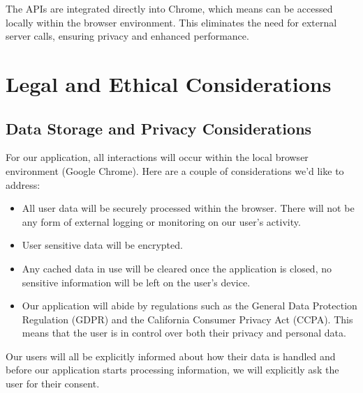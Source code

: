 \documentclass{article}
\begin{document}
The APIs are integrated directly into Chrome, which means can be accessed locally within the browser environment. This eliminates the need for external server calls, ensuring privacy and enhanced performance.

\section{Legal and Ethical Considerations}
\subsection{Data Storage and Privacy Considerations}
For our application, all interactions will occur within the local browser environment (Google Chrome). Here are a couple of considerations we'd like to address:
\begin{itemize}
    \item All user data will be securely processed within the browser. There will not be any form of external logging or monitoring on our user's activity.
    \item User sensitive data will be encrypted.
    \item Any cached data in use will be cleared once the application is closed, no sensitive information will be left on the user’s device.
    \item Our application will abide by regulations such as the General Data Protection Regulation (GDPR) and the California Consumer Privacy Act (CCPA). This means that the user is in control over both their privacy and personal data.
\end{itemize}
Our users will all be explicitly informed about how their data is handled and before our application starts processing information, we will explicitly ask the user for their consent.
\end{document}
